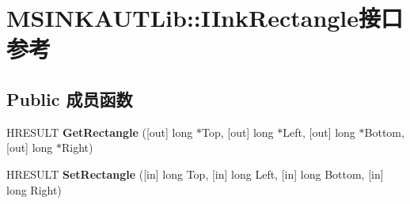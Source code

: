 \hypertarget{interface_m_s_i_n_k_a_u_t_lib_1_1_i_ink_rectangle}{}\section{M\+S\+I\+N\+K\+A\+U\+T\+Lib\+:\+:I\+Ink\+Rectangle接口 参考}
\label{interface_m_s_i_n_k_a_u_t_lib_1_1_i_ink_rectangle}
\subsection*{Public 成员函数}
\begin{DoxyCompactItemize}
\item 
\mbox{\label{interface_m_s_i_n_k_a_u_t_lib_1_1_i_ink_rectangle_af0af4aec4f919a9c986b257af4fe1eb3}} 
H\+R\+E\+S\+U\+LT {\bfseries Get\+Rectangle} (\mbox{[}out\mbox{]} long $\ast$Top, \mbox{[}out\mbox{]} long $\ast$Left, \mbox{[}out\mbox{]} long $\ast$Bottom, \mbox{[}out\mbox{]} long $\ast$Right)
\item 
\mbox{\label{interface_m_s_i_n_k_a_u_t_lib_1_1_i_ink_rectangle_a9952d1356c0a1a66b1400ebcb9786290}} 
H\+R\+E\+S\+U\+LT {\bfseries Set\+Rectangle} (\mbox{[}in\mbox{]} long Top, \mbox{[}in\mbox{]} long Left, \mbox{[}in\mbox{]} long Bottom, \mbox{[}in\mbox{]} long Right)
\end{DoxyCompactItemize}
